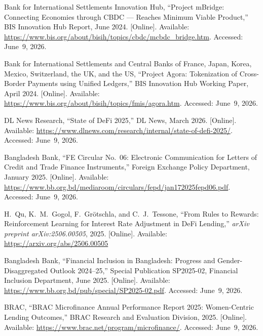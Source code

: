 \documentclass[12pt,a4paper]{report}
\begin{document}
{\begin{enumerate}[label={[\arabic*]}]
\item Bank for International Settlements Innovation Hub, ``Project mBridge: Connecting Economies through CBDC --- Reaches Minimum Viable Product,'' BIS Innovation Hub Report, June 2024. [Online]. Available: \url{https://www.bis.org/about/bisih/topics/cbdc/mcbdc_bridge.htm}. Accessed: June~9, 2026.

\item Bank for International Settlements and Central Banks of France, Japan, Korea, Mexico, Switzerland, the UK, and the US, ``Project Agora: Tokenization of Cross-Border Payments using Unified Ledgers,'' BIS Innovation Hub Working Paper, April 2024. [Online]. Available: \url{https://www.bis.org/about/bisih/topics/fmis/agora.htm}. Accessed: June~9, 2026.

\item DL News Research, ``State of DeFi 2025,'' DL News, March 2026. [Online]. Available: \url{https://www.dlnews.com/research/internal/state-of-defi-2025/}. Accessed: June~9, 2026.
\item Bangladesh Bank, ``FE Circular No.~06: Electronic Communication for Letters of Credit and Trade Finance Instruments,'' Foreign Exchange Policy Department, January 2025. [Online]. Available: \url{https://www.bb.org.bd/mediaroom/circulars/fepd/jan172025fepd06.pdf}. Accessed: June~9, 2026.

\item H.~Qu, K.~M.~Gogol, F.~Gr\"{o}tschla, and C.~J.~Tessone, ``From Rules to Rewards: Reinforcement Learning for Interest Rate Adjustment in DeFi Lending,'' \textit{arXiv preprint arXiv:2506.00505}, 2025. [Online]. Available: \url{https://arxiv.org/abs/2506.00505}
\item Bangladesh Bank, ``Financial Inclusion in Bangladesh: Progress and Gender-Disaggregated Outlook 2024--25,'' Special Publication SP2025-02, Financial Inclusion Department, June 2025. [Online]. Available: \url{https://www.bb.org.bd/pub/special/SP2025-02.pdf}. Accessed: June~9, 2026.

\item BRAC, ``BRAC Microfinance Annual Performance Report 2025: Women-Centric Lending Outcomes,'' BRAC Research and Evaluation Division, 2025. [Online]. Available: \url{https://www.brac.net/program/microfinance/}. Accessed: June~9, 2026.


\end{enumerate}}
\end{document}
